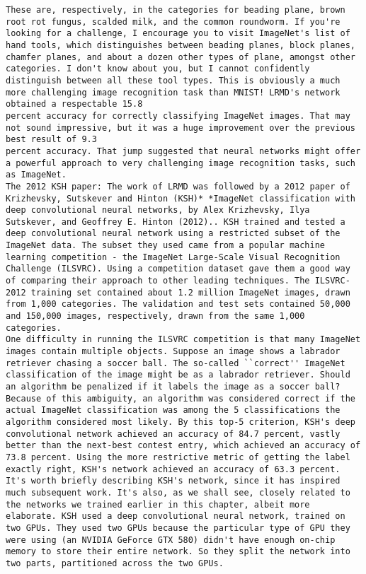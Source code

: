 \begin{lstlisting}
These are, respectively, in the categories for beading plane, brown root rot fungus, scalded milk, and the common roundworm. If you're looking for a challenge, I encourage you to visit ImageNet's list of hand tools, which distinguishes between beading planes, block planes, chamfer planes, and about a dozen other types of plane, amongst other categories. I don't know about you, but I cannot confidently distinguish between all these tool types. This is obviously a much more challenging image recognition task than MNIST! LRMD's network obtained a respectable 15.8
percent accuracy for correctly classifying ImageNet images. That may not sound impressive, but it was a huge improvement over the previous best result of 9.3
percent accuracy. That jump suggested that neural networks might offer a powerful approach to very challenging image recognition tasks, such as ImageNet.
The 2012 KSH paper: The work of LRMD was followed by a 2012 paper of Krizhevsky, Sutskever and Hinton (KSH)* *ImageNet classification with deep convolutional neural networks, by Alex Krizhevsky, Ilya Sutskever, and Geoffrey E. Hinton (2012).. KSH trained and tested a deep convolutional neural network using a restricted subset of the ImageNet data. The subset they used came from a popular machine learning competition - the ImageNet Large-Scale Visual Recognition Challenge (ILSVRC). Using a competition dataset gave them a good way of comparing their approach to other leading techniques. The ILSVRC-2012 training set contained about 1.2 million ImageNet images, drawn from 1,000 categories. The validation and test sets contained 50,000 and 150,000 images, respectively, drawn from the same 1,000 categories.
One difficulty in running the ILSVRC competition is that many ImageNet images contain multiple objects. Suppose an image shows a labrador retriever chasing a soccer ball. The so-called ``correct'' ImageNet classification of the image might be as a labrador retriever. Should an algorithm be penalized if it labels the image as a soccer ball? Because of this ambiguity, an algorithm was considered correct if the actual ImageNet classification was among the 5 classifications the algorithm considered most likely. By this top-5 criterion, KSH's deep convolutional network achieved an accuracy of 84.7 percent, vastly better than the next-best contest entry, which achieved an accuracy of 73.8 percent. Using the more restrictive metric of getting the label exactly right, KSH's network achieved an accuracy of 63.3 percent.
It's worth briefly describing KSH's network, since it has inspired much subsequent work. It's also, as we shall see, closely related to the networks we trained earlier in this chapter, albeit more elaborate. KSH used a deep convolutional neural network, trained on two GPUs. They used two GPUs because the particular type of GPU they were using (an NVIDIA GeForce GTX 580) didn't have enough on-chip memory to store their entire network. So they split the network into two parts, partitioned across the two GPUs.

\end{lstlisting}
